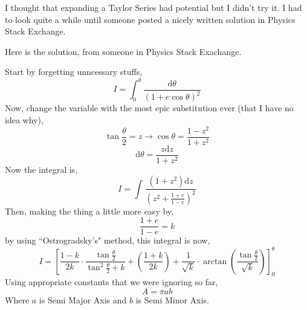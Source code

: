 \documentclass[12pt,a4paper]{article}
\begin{document}
I thought that expanding a Taylor Series had potential but I didn't try it. I had to look quite a while until someone posted a nicely written solution in Physics Stack Exchange. 

Here is the solution, from someone in Physics Stack Exachange.

Start by forgetting unncessary stuffs,
\[ 
    I = \int_{0}^{\theta} \frac{\mathrm{d} \theta}{(1 + e \cos \theta)^2} 
\]
Now, change the variable with the most epic substitution ever (that I have no idea why),
\[ 
\tan \frac{\theta}{2} = z \to \cos \theta = \frac{1 - z^2}{1 + z^2}
\]
\[ 
\mathrm{d} \theta = \frac{z \mathrm{d} z}{1 + z^2}
\]
Now the integral is,
\[ 
    I = \int_{ }^{} \frac{\left( 1  + z^2 \right) \mathrm{d} z}{\left(z^2 + 
    \frac{1 + e}{1-e} \right)^2
    }  
\]
Then, making the thing a little more easy by,
\[ 
\frac{1+e}{1-e} = k
\]
by using ``Ostrogradsky's" method, this integral is now,
\[ 
I = \left[
    \frac{1-k}{2k} \cdot \frac{\tan \frac{\theta}{2}}{\tan ^2 \frac{\theta}{2} + k} +
    \left( \frac{1+k}{2k} \right) + \frac{1}{\sqrt{k} }\cdot \arctan \left(  \frac{\tan \frac{\theta}{2}}{\sqrt{k} }  \right)  
\right]_{ 0 }^{ \theta }
\]
Using appropriate constants that we were ignoring so far, 
\[ 
    \boxed{  A = \pi a b}
\]
Where $a$ is Semi Major Axis and $b$ is Semi Minor Axis.
\end{document}
